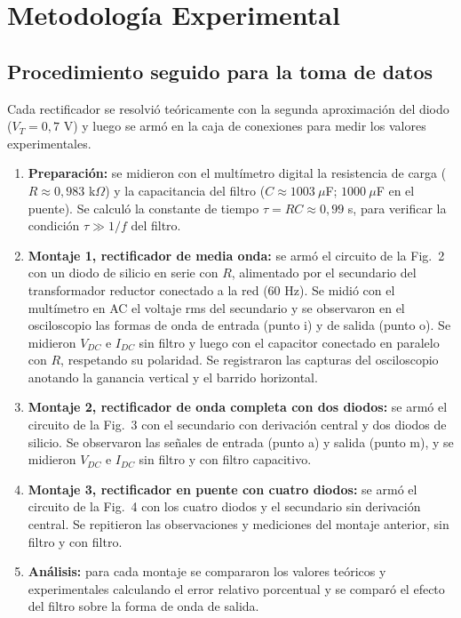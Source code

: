 \section{Metodología Experimental}

\subsection{Procedimiento seguido para la toma de datos}

Cada rectificador se resolvió teóricamente con la segunda aproximación del
diodo ($V_T = 0{,}7$ V) y luego se armó en la caja de conexiones para medir
los valores experimentales.

\begin{enumerate}
    \item \textbf{Preparación:} se midieron con el multímetro digital la
    resistencia de carga ($R \approx 0{,}983$ k$\Omega$) y la capacitancia
    del filtro ($C \approx 1003\ \mu$F; $1000\ \mu$F en el puente). Se
    calculó la constante de tiempo $\tau = RC \approx 0{,}99$ s, para
    verificar la condición $\tau \gg 1/f$ del filtro.

    \item \textbf{Montaje 1, rectificador de media onda:} se armó el circuito
    de la Fig.~2 con un diodo de silicio en serie con $R$, alimentado por el
    secundario del transformador reductor conectado a la red (60 Hz). Se
    midió con el multímetro en AC el voltaje rms del secundario y se
    observaron en el osciloscopio las formas de onda de entrada (punto i) y
    de salida (punto o). Se midieron $V_{DC}$ e $I_{DC}$ sin filtro y luego
    con el capacitor conectado en paralelo con $R$, respetando su polaridad.
    Se registraron las capturas del osciloscopio anotando la ganancia
    vertical y el barrido horizontal.

    \item \textbf{Montaje 2, rectificador de onda completa con dos diodos:}
    se armó el circuito de la Fig.~3 con el secundario con derivación central
    y dos diodos de silicio. Se observaron las señales de entrada (punto a)
    y salida (punto m), y se midieron $V_{DC}$ e $I_{DC}$ sin filtro y con
    filtro capacitivo.

    \item \textbf{Montaje 3, rectificador en puente con cuatro diodos:} se
    armó el circuito de la Fig.~4 con los cuatro diodos y el secundario sin
    derivación central. Se repitieron las observaciones y mediciones del
    montaje anterior, sin filtro y con filtro.

    \item \textbf{Análisis:} para cada montaje se compararon los valores
    teóricos y experimentales calculando el error relativo porcentual y se
    comparó el efecto del filtro sobre la forma de onda de salida.
\end{enumerate}

